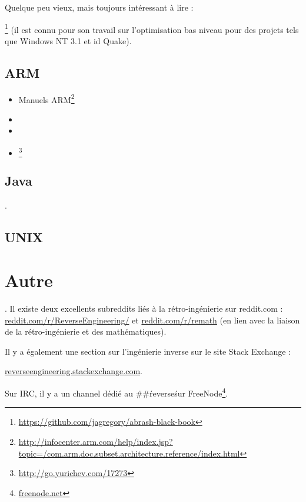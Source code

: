 Quelque peu vieux, mais toujours intéressant à lire :

\MAbrash\footnote{\AlsoAvailableAs \url{https://github.com/jagregory/abrash-black-book}}
(il est connu pour son travail sur l'optimisation bas niveau pour des projets tels que Windows NT 3.1 et id Quake).

\subsection{ARM}

\begin{itemize}
\item Manuels ARM\footnote{\AlsoAvailableAs \url{http://infocenter.arm.com/help/index.jsp?topic=/com.arm.doc.subset.architecture.reference/index.html}}

\item \ARMSevenRef

\item \ARMSixFourRefURL

\item \ARMCookBook\footnote{\AlsoAvailableAs \url{http://go.yurichev.com/17273}}
\end{itemize}

\subsection{Java}

\JavaBook.

\subsection{UNIX}

\TAOUP



\section{Autre}

\HenryWarren.
Il existe deux excellents subreddits liés à la \ac{rétro-ingénierie} sur reddit.com :
\href{http://go.yurichev.com/17027}{reddit.com/r/ReverseEngineering/} et
\href{http://go.yurichev.com/17028}{reddit.com/r/remath}
(en lien avec la liaison de la \ac{rétro-ingénierie} et des mathématiques).

Il y a également une section sur l'\ac{ingénierie inverse} sur le site Stack Exchange :

\par \href{http://go.yurichev.com/17029}{reverseengineering.stackexchange.com}.

Sur IRC, il y a un channel dédié au \#\#\'reverse\' sur
FreeNode\footnote{\href{http://go.yurichev.com/17030}{freenode.net}}.

